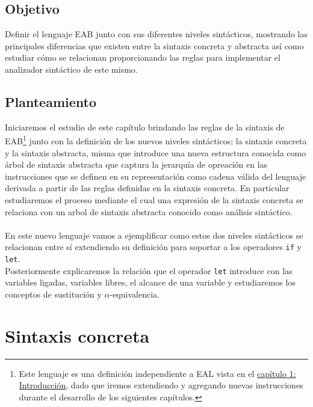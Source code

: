 \subsection*{Objetivo}
Definir el lenguaje \textsf{EAB} junto con sus diferentes niveles sintácticos, mostrando las principales diferencias que existen entre la sintaxis concreta y abstracta así como estudiar cómo se relacionan proporcionando las reglas para implementar el analizador sintáctico de este mismo.


\subsection*{Planteamiento}
Iniciaremos el estudio de este capítulo brindando las reglas de la sintaxis de \textsf{EAB}\footnote{Este lenguaje es una definición independiente a \textsf{EAL} vista en el \hyperref[sec:intro]{capítulo 1: Introducción}, dado que iremos extendiendo y agregando nuevas instrucciones durante el desarrollo de los siguientes capítulos.} junto con la definición de los nuevos niveles sintácticos; la sintaxis concreta y la sintaxis abstracta, misma que introduce una nueva estructura conocida como árbol de sintaxis abstracta que captura la jerarquía de opreación en las instrucciones que se definen en su representación como cadena válida del lenguaje derivada a partir de las reglas definidas en la sintaxis concreta. En particular estudiaremos el proceso mediante el cual una expresión de la sintaxis concreta se relaciona con un arbol de sintaxis abstracta conocido como análisis sintáctico. \\\\
En este nuevo lenguaje vamos a ejemplificar como estos dos niveles sintácticos se relacionan entre sí extendiendo su definición para soportar a los operadores \texttt{if} y \texttt{let}. \\
Posteriormente explicaremos la relación que el operador \texttt{let} introduce con las variables ligadas, variables libres, el alcance de una variable y estudiaremos los conceptos de sustitución y $\alpha$-equivalencia.


\section{Sintaxis concreta}

